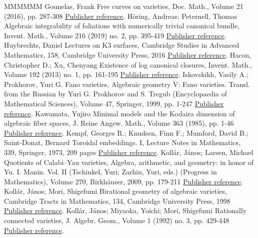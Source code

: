 \documentclass[11pt]{article}
\theoremstyle{definition}
\numberwithin{equation}{section}
\numberwithin{figure}{section}
\numberwithin{table}{section}
\begin{document}
\begin{thebibliography}{MMMMMM}
 Gounelas, Frank Free curves on varieties, Doc. Math., Volume 21 (2016), pp. 287-308 \href{https://ahl.centre-mersenne.org/item/AHL_2020__3__473_0/#Gou16}{Publisher reference}.
 Höring, Andreas; Peternell, Thomas Algebraic integrability of foliations with numerically trivial canonical bundle, Invent. Math., Volume 216 (2019) no. 2, pp. 395-419 \href{https://ahl.centre-mersenne.org/item/AHL_2020__3__473_0/#HP17}{Publisher reference}.
 Huybrechts, Daniel Lectures on K3 surfaces, Cambridge Studies in Advanced Mathematics, 158, Cambridge University Press, 2016 \href{https://ahl.centre-mersenne.org/item/AHL_2020__3__473_0/#Huy16}{Publisher reference}.
 Hacon, Christopher D.; Xu, Chenyang Existence of log canonical closures, Invent. Math., Volume 192 (2013) no. 1, pp. 161-195 \href{https://ahl.centre-mersenne.org/item/AHL_2020__3__473_0/#HX13}{Publisher reference}.
 Iskovskikh, Vasily A.; Prokhorov, Yuri G. Fano varieties, Algebraic geometry V: Fano varieties. Transl. from the Russian by Yuri G. Prokhorov and S. Tregub (Encyclopaedia of Mathematical Sciences), Volume 47, Springer, 1999, pp. 1-247 \href{https://ahl.centre-mersenne.org/item/AHL_2020__3__473_0/#IP99}{Publisher reference}.
 Kawamata, Yujiro Minimal models and the Kodaira dimension of algebraic fiber spaces, J. Reine Angew. Math., Volume 363 (1985), pp. 1-46 \href{https://ahl.centre-mersenne.org/item/AHL_2020__3__473_0/#Kaw85b}{Publisher reference}.
 Kempf, Georges R.; Knudsen, Finn F.; Mumford, David B.; Saint-Donat, Bernard Toroidal embeddings. I, Lecture Notes in Mathematics, 339, Springer, 1973, 209 pages \href{https://ahl.centre-mersenne.org/item/AHL_2020__3__473_0/#KKMS}{Publisher reference}.
 Kollár, János; Larsen, Michael Quotients of Calabi–Yau varieties, Algebra, arithmetic, and geometry: in honor of Yu. I. Manin. Vol. II (Tschinkel, Yuri; Zarhin, Yuri, eds.) (Progress in Mathematics), Volume 270, Birkhäuser, 2009, pp. 179-211 \href{https://ahl.centre-mersenne.org/item/AHL_2020__3__473_0/#KL09}{Publisher reference}.
 Kollár, János; Mori, Shigefumi Birational geometry of algebraic varieties, Cambridge Tracts in Mathematics, 134, Cambridge University Press, 1998 \href{https://ahl.centre-mersenne.org/item/AHL_2020__3__473_0/#KM98}{Publisher reference}.
 Kollár, János; Miyaoka, Yoichi; Mori, Shigefumi Rationally connected varieties, J. Algebr. Geom., Volume 1 (1992) no. 3, pp. 429-448 \href{https://ahl.centre-mersenne.org/item/AHL_2020__3__473_0/#KMM92}{Publisher reference}.

\end{thebibliography}
\end{document}
